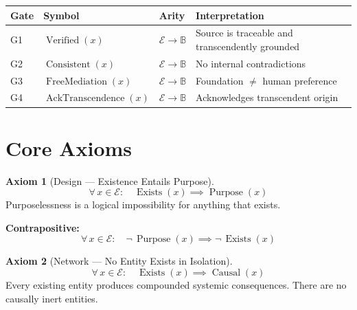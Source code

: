 \documentclass[11pt,a4paper]{article}
\theoremstyle{definition}
\newtheorem{axiom}{Axiom}
\newcommand{\E}{\mathcal{E}}      %
\newcommand{\Exists}{\operatorname{Exists}}
\newcommand{\Purpose}{\operatorname{Purpose}}
\newcommand{\Causal}{\operatorname{Causal}}
\newcommand{\Verified}{\operatorname{Verified}}
\newcommand{\Consistent}{\operatorname{Consistent}}
\newcommand{\FreeMediation}{\operatorname{FreeMediation}}
\newcommand{\AckTranscendence}{\operatorname{AckTranscendence}}
\begin{document}
\begin{center}
\begin{tabular}{@{} l l l p{6cm} @{}}
\toprule
\textbf{Gate} & \textbf{Symbol} & \textbf{Arity} & \textbf{Interpretation} \\
\midrule
G1 & $\Verified(x)$          & $\E \to \mathbb{B}$ & Source is traceable and transcendently grounded \\
G2 & $\Consistent(x)$        & $\E \to \mathbb{B}$ & No internal contradictions \\
G3 & $\FreeMediation(x)$     & $\E \to \mathbb{B}$ & Foundation $\neq$ human preference \\
G4 & $\AckTranscendence(x)$  & $\E \to \mathbb{B}$ & Acknowledges transcendent origin \\
\bottomrule
\end{tabular}
\end{center}

\section{Core Axioms}

\begin{axiom}[Design --- Existence Entails Purpose]
\label{ax:design}
\begin{equation}
\forall\, x \in \E : \quad \Exists(x) \implies \Purpose(x)
\end{equation}
Purposelessness is a logical impossibility for anything that exists.

\medskip\noindent
\textbf{Contrapositive:}
\begin{equation}
\forall\, x \in \E : \quad \lnot\,\Purpose(x) \implies \lnot\,\Exists(x)
\end{equation}
\end{axiom}

\begin{axiom}[Network --- No Entity Exists in Isolation]
\label{ax:network}
\begin{equation}
\forall\, x \in \E : \quad \Exists(x) \implies \Causal(x)
\end{equation}
Every existing entity produces compounded systemic consequences.  There are no
causally inert entities.
\end{axiom}
\end{document}

